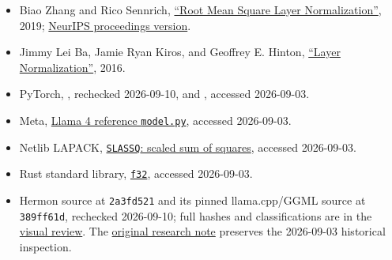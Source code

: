 \begin{itemize}
\tightlist
\item
  Biao Zhang and Rico Sennrich,
  \href{https://arxiv.org/abs/1910.07467}{``Root Mean Square Layer
  Normalization''}, 2019;
  \href{https://papers.neurips.cc/paper_files/paper/2019/file/1e8a19426224ca89e83cef47f1e7f53b-Paper.pdf}{NeurIPS
  proceedings version}.
\item
  Jimmy Lei Ba, Jamie Ryan Kiros, and Geoffrey E. Hinton,
  \href{https://arxiv.org/abs/1607.06450}{``Layer Normalization''},
  2016.
\item
  PyTorch,
  \href{https://docs.pytorch.org/docs/2.14/generated/torch.nn.RMSNorm.html}{\texttt{}},
  rechecked 2026-09-10, and
  \href{https://docs.pytorch.org/docs/stable/generated/torch.nn.Embedding.html}{\texttt{}},
  accessed 2026-09-03.
\item
  Meta,
  \href{https://github.com/meta-llama/llama-models/blob/main/models/llama4/model.py}{Llama
  4 reference \texttt{model.py}}, accessed 2026-09-03.
\item
  Netlib LAPACK,
  \href{https://www.netlib.org/lapack/explore-html/d8/d76/group__lassq_ga0596b4bfa745d0d1c5817d4790921cda.html}{\texttt{SLASSQ}:
  scaled sum of squares}, accessed 2026-09-03.
\item
  Rust standard library,
  \href{https://doc.rust-lang.org/std/primitive.f32.html}{\texttt{f32}},
  accessed 2026-09-03.
\item
  Hermon source at \texttt{2a3fd521} and its pinned llama.cpp/GGML
  source at \texttt{389ff61d}, rechecked 2026-09-10; full hashes and
  classifications are in the
  \href{https://github.com/hermonai/inside-the-llm-engine/blob/astra-visual-rewrite/research/astra/chapter07-regeneration.md}{visual
  review}. The
  \href{https://github.com/hermonai/inside-the-llm-engine/blob/astra-visual-rewrite/research/part-02/chapter-07-embeddings-and-normalization.md}{original
  research note} preserves the 2026-09-03 historical inspection.
\end{itemize}



